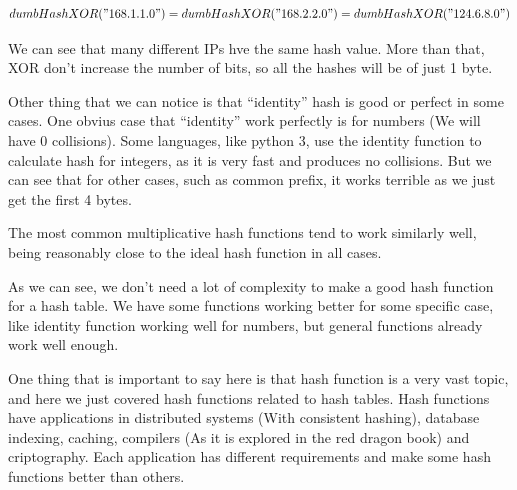 \[ dumbHashXOR("168.1.1.0") = dumbHashXOR("168.2.2.0") = dumbHashXOR("124.6.8.0") \]

We can see that many different IPs hve the same hash value. More than that, XOR don't increase the number of bits, so all the hashes will be of just 1 byte.

Other thing that we can notice is that ``identity'' hash is good or perfect in some cases. One obvius case that ``identity'' work perfectly is for numbers (We will have 0 collisions). Some languages, like python 3, use the identity function to calculate hash for integers, as it is very fast and produces no collisions. But we can see that for other cases, such as common prefix, it works terrible as we just get the first 4 bytes.

The most common multiplicative hash functions tend to work similarly well, being reasonably close to the ideal hash function in all cases.

As we can see, we don't need a lot of complexity to make a good hash function for a hash table. We have some functions working better for some specific case, like identity function working well for numbers, but general functions already work well enough.

One thing that is important to say here is that hash function is a very vast topic, and here we just covered hash functions related to hash tables. Hash functions have applications in distributed systems (With consistent hashing), database indexing, caching, compilers (As it is explored in the red dragon book) and criptography. Each application has different requirements and make some hash functions better than others.